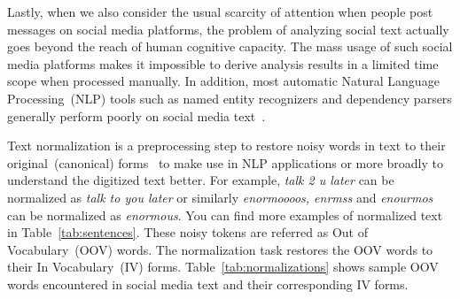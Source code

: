 \documentclass[a4paper,onesided,12pt]{report}
\begin{document}
Lastly, when we also consider the usual scarcity of attention when people post messages on social media platforms, the problem of analyzing social text actually goes beyond the reach of human cognitive capacity. The mass usage of such social media platforms makes it impossible to derive analysis results in a limited time scope when processed manually. In addition, most automatic Natural Language Processing~(NLP) tools such as named entity recognizers and  dependency parsers generally perform poorly on social media text~\cite{ritter2010unsupervised}.

Text normalization is a preprocessing step to restore noisy words in text to their original~(canonical) forms~\cite{Han:2011:LNS:2002472.2002520} to make use in NLP applications or more broadly to understand the digitized text better. For example, \textit{talk 2 u later} can be normalized as \textit{talk to you later} or similarly \textit{enormoooos, enrmss} and \textit{enourmos} can be normalized as \textit{enormous}. You can find more examples of normalized text in Table~\ref{tab:sentences}. These noisy tokens are referred as Out of Vocabulary~(OOV) words. The normalization task restores the OOV words to their In Vocabulary~(IV) forms. Table~\ref{tab:normalizations} shows sample OOV words encountered in social media text and their corresponding IV forms.
\end{document}

